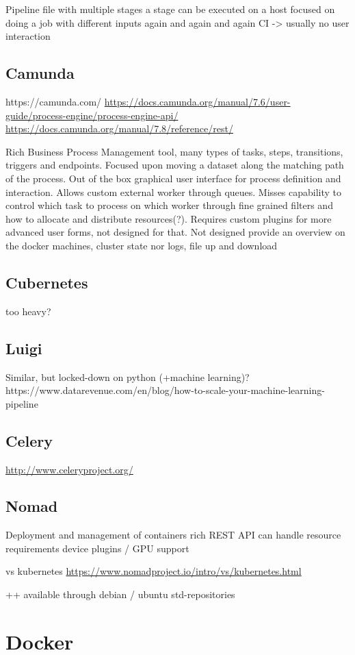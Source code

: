 Pipeline file with multiple stages
a stage can be executed on a host
focused on doing a job with different inputs again and again and again
CI -> usually no user interaction

\subsection{Camunda}

https://camunda.com/
\url{https://docs.camunda.org/manual/7.6/user-guide/process-engine/process-engine-api/}
\url{https://docs.camunda.org/manual/7.8/reference/rest/}

Rich Business Process Management tool, many types of tasks, steps, transitions, triggers and endpoints.
Focused upon moving a dataset along the matching path of the process.
Out of the box graphical user interface for process definition and interaction.
Allows custom external worker through queues.
Misses capability to control which task to process on which worker through fine grained filters and how to allocate and distribute resources(?).
Requires custom plugins for more advanced user forms, not designed for that.
Not designed provide an overview on the docker machines, cluster state nor logs, file up and download

\subsection{Cubernetes}

too heavy?

\subsection{Luigi}

Similar, but locked-down on python  (+machine learning)?
https://www.datarevenue.com/en/blog/how-to-scale-your-machine-learning-pipeline

\subsection{Celery}

\url{http://www.celeryproject.org/}

\subsection{Nomad}

Deployment and management of containers
rich REST API
can handle resource requirements
device plugins / GPU support

vs kubernetes \url{https://www.nomadproject.io/intro/vs/kubernetes.html}

++ available through debian / ubuntu std-repositories

\section{Docker}
